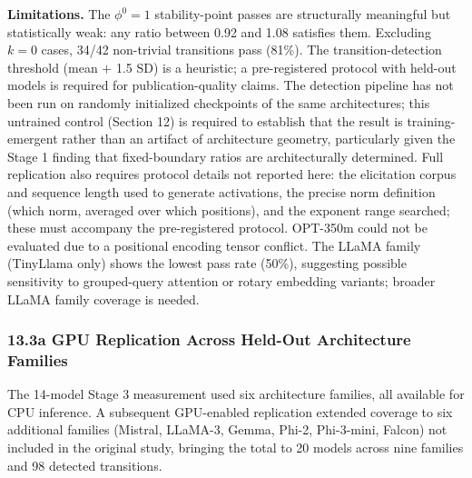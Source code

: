 \documentclass[12pt]{article}
\begin{document}
\textbf{Limitations.} The \(\phi^0 = 1\) stability-point passes are
structurally meaningful but statistically weak: any ratio between 0.92
and 1.08 satisfies them. Excluding \(k=0\) cases, 34/42 non-trivial
transitions pass (81\%). The transition-detection threshold (mean \(+\)
1.5 SD) is a heuristic; a pre-registered protocol with held-out models
is required for publication-quality claims. The detection pipeline has
not been run on randomly initialized checkpoints of the same
architectures; this untrained control (Section 12) is required to
establish that the result is training-emergent rather than an artifact
of architecture geometry, particularly given the Stage 1 finding that
fixed-boundary ratios are architecturally determined. Full replication
also requires protocol details not reported here: the elicitation corpus
and sequence length used to generate activations, the precise norm
definition (which norm, averaged over which positions), and the exponent
range searched; these must accompany the pre-registered protocol.
OPT-350m could not be evaluated due to a positional encoding tensor
conflict. The LLaMA family (TinyLlama only) shows the lowest pass rate
(50\%), suggesting possible sensitivity to grouped-query attention or
rotary embedding variants; broader LLaMA family coverage is needed.

\subsubsection{13.3a GPU Replication Across Held-Out Architecture
Families}\label{a-gpu-replication-across-held-out-architecture-families}

The 14-model Stage 3 measurement used six architecture families, all
available for CPU inference. A subsequent GPU-enabled replication
extended coverage to six additional families (Mistral, LLaMA-3, Gemma,
Phi-2, Phi-3-mini, Falcon) not included in the original study, bringing
the total to 20 models across nine families and 98 detected transitions.
\end{document}

